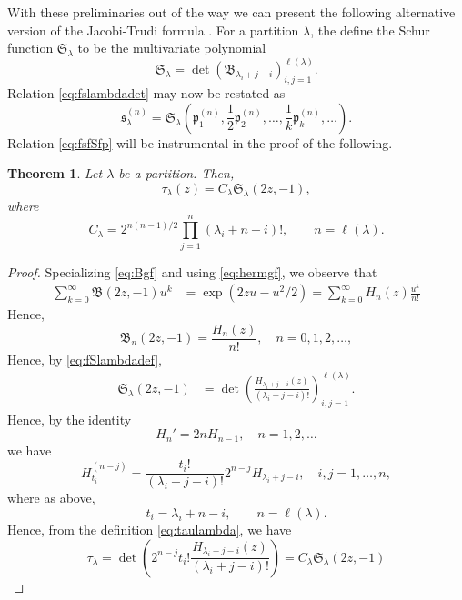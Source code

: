 \documentclass{amsart}
\newtheorem{theorem}{Theorem}
\theoremstyle{definition}
\newcommand{\fB}{\mathfrak{B}}
\newcommand{\fS}{\mathfrak{S}}
\newcommand{\fs}{\mathfrak{s}}
\newcommand{\fp}{\mathfrak{p}}
\begin{document}
With these preliminaries out of the way we can present the following
alternative version of the Jacobi-Trudi formula
\cite{veselovsergeev,harnadlee}.  For a partition $\lambda$, the
define the Schur function $\fS_\lambda$ to be the multivariate
polynomial
\begin{equation}
  \label{eq:fSlambdadef}
  \fS_\lambda =  \det(
  \fB_{\lambda_i+j-i})_{i,j=1}^{\ell(\lambda)}. 
\end{equation}
Relation \eqref{eq:fslambdadet} may now be restated as
\begin{equation}
  \label{eq:fsfSfp}
  \fs^{(n)}_\lambda = \fS_\lambda(\fp^{(n)}_1, \frac12 \fp^{(n)}_2 ,
  \ldots , \frac{1}{k} \fp^{(n)}_k,\ldots).
\end{equation}
Relation \eqref{eq:fsfSfp} will be instrumental in the proof of the
following.
\begin{theorem}
  \label{thm:tauschur}
  Let $\lambda$ be a partition.  Then,
  \[ \tau_\lambda(z) = C_\lambda\fS_\lambda(2z,-1),\]
  where
  \[ C_\lambda = 2^{n(n-1)/2} \prod_{j=1}^n (\lambda_i +
    n-i)!,\qquad n= \ell(\lambda).\]
\end{theorem}
\begin{proof}
  Specializing \eqref{eq:Bgf} and using \eqref{eq:hermgf}, we observe
  that
  \begin{align*}
    \sum_{k=0}^\infty  \fB(2z,-1)u^k
    &= \exp\left(2z u -  u^2/2\right) =  \sum_{k=0}^\infty H_n(z)
      \frac{u^k}{n!}       
  \end{align*}
  Hence,
  \[   \fB_n(2z,-1) = \frac{H_n(z)}{n!} ,\quad n=0,1,2,\ldots, \]
  Hence, by \eqref{eq:fSlambdadef},
  \begin{align*}
    \fS_\lambda(2z,-1) &= \det \left( \frac{H_{\lambda_i +
                         j-i}(z)}{(\lambda_i + j-i)!}
                         \right)_{i,j=1}^{\ell(\lambda)}. 
  \end{align*}
  Hence, by the identity
  \[ H_n' = 2n H_{n-1},\quad n=1,2,\ldots \]
  we have
  \[ H_{t_i}^{(n-j)}=\frac{t_i!}{(\lambda_i+j-i)!} 2^{n-j} H_{\lambda_i+j-i}
    ,\quad i,j=1,\ldots, n, \]
  where as above,
  \[ t_i = \lambda_i + n - i,\qquad n= \ell(\lambda).\] Hence, from
  the definition \eqref{eq:taulambda}, we have
  \[ \tau_\lambda = \det \left(  2^{n-j} t_i! \frac{H_{\lambda_i +
          j-i}(z)}{(\lambda_i + j-i)!}\right)
    = C_\lambda
    \fS_\lambda(2z,-1) \]
\end{proof}
\end{document}
